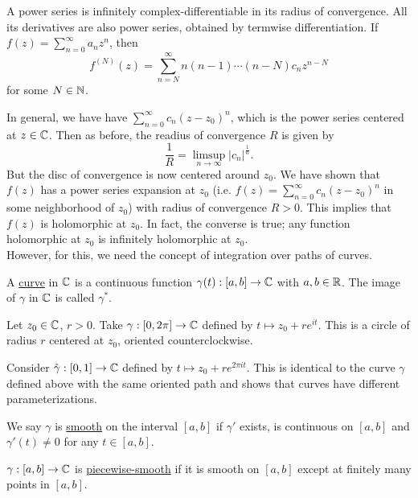 \documentclass[11pt]{article}
\begin{document}
\begin{corollary}
A power series is infinitely complex-differentiable in its radius of
convergence. All its derivatives are also power series, obtained by termwise
differentiation. If $\displaystyle f(z) = \sum^\infty_{n=0}a_nz^n$, then
\begin{equation*}
f^{(N)}(z) = \sum^\infty_{n=N}n(n-1)\cdots(n-N)c_nz^{n-N}
\end{equation*}
for some $N \in \mathbb{N}$.
\end{corollary}
In general, we have have $\displaystyle \sum^\infty_{n=0} c_n(z - z_0)^n$, which
is the power series centered at $z \in \mathbb{C}$. Then as before, the readius of
convergence $R$ is given by
\begin{equation*}
\frac{1}{R} = \limsup_{n\to\infty} |c_n|^{\frac{1}{n}}.
\end{equation*}
But the disc of convergence is now centered around $z_0$. We have shown that
$f(z)$ has a power series expansion at $z_0$ (i.e. $\displaystyle f(z) =
\sum^\infty_{n=0}c_n(z - z_0)^n$ in some neighborhood of $z_0$) with radius of
convergence $R > 0$. This implies that $f(z)$ is holomorphic at $z_0$. In fact,
the converse is true; any function holomorphic at $z_0$ is infinitely
holomorphic at $z_0$.\\
However, for this, we need the concept of integration over paths of curves.
\begin{definition}
A \underline{curve} in $\mathbb{C}$ is a continuous function $\gamma(t) : [a,b] \to \mathbb{C}$
with $a,b \in \mathbb{R}$. The image of $\gamma$ in $\mathbb{C}$ is called $\gamma^*$.
\end{definition}
\begin{example}
Let $z_0 \in \mathbb{C}$, $r > 0$. Take $\gamma: [0, 2\pi] \to \mathbb{C}$ defined by $t \mapsto
z_0 + re^{it}$. This is a circle of radius $r$ centered at $z_0$, oriented
counterclockwise.
\end{example}
\begin{example}
Consider $\hat\gamma: [0,1] \to \mathbb{C}$ defined by $t \mapsto z_0 + re^{2\pi it}$. This
is identical to the curve $\gamma$ defined above with the same oriented path and
shows that curves have different parameterizations.
\end{example}
\begin{definition}
We say $\gamma$ is \underline{smooth} on the interval $[a,b]$ if $\gamma'$
exists, is continuous on $[a,b]$ and $\gamma'(t) \neq 0$ for any $t \in [a,b]$.
\end{definition}
\begin{definition}
$\gamma: [a,b] \to \mathbb{C}$ is \underline{piecewise-smooth} if it is smooth on
$[a,b]$ except at finitely many points in $[a,b]$.
\end{definition}
\end{document}
